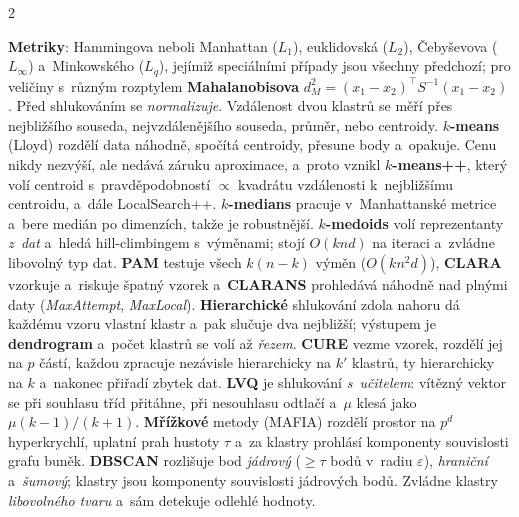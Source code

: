\documentclass[10pt,a4paper]{article}
\newcommand{\hh}[1]{\par\smallskip\noindent{\bfseries\color{headcol}#1}\par\nobreak\vspace{-0.2em}}
\newcommand{\tm}[1]{\textbf{#1}}
\begin{document}
\begin{multicols}{2}
\hh{Klastrová analýza}
\tm{Metriky}: Hammingova neboli Manhattan ($L_1$), euklidovská ($L_2$), Čebyševova
($L_\infty$) a~Minkowského ($L_q$), jejímiž speciálními případy jsou všechny předchozí;
pro veličiny s~různým rozptylem \tm{Mahalanobisova}
$d_M^2=(x_1-x_2)^{\!\top}S^{-1}(x_1-x_2)$. Před shlukováním se \emph{normalizuje}.
Vzdálenost dvou klastrů se měří přes nejbližšího souseda, nejvzdálenějšího souseda, průměr,
nebo centroidy.
\tm{$k$-means} (Lloyd) rozdělí data náhodně, spočítá centroidy, přesune body a~opakuje.
Cenu nikdy nezvýší, ale nedává záruku aproximace, a~proto vznikl \tm{$k$-means++}, který volí
centroid s~pravděpodobností $\propto$ kvadrátu vzdálenosti k~nejbližšímu centroidu, a~dále
LocalSearch++.
\tm{$k$-medians} pracuje v~Manhattanské metrice a~bere medián po dimenzích, takže je
robustnější. \tm{$k$-medoids} volí reprezentanty \emph{z~dat} a~hledá hill-climbingem
s~výměnami; stojí $O(knd)$ na iteraci a~zvládne libovolný typ dat. \tm{PAM} testuje všech
$k(n-k)$ výměn ($O(kn^2d)$), \tm{CLARA} vzorkuje a~riskuje špatný vzorek a~\tm{CLARANS}
prohledává náhodně nad plnými daty (\emph{MaxAttempt}, \emph{MaxLocal}).
\tm{Hierarchické} shlukování zdola nahoru dá každému vzoru vlastní klastr a~pak slučuje dva
nejbližší; výstupem je \tm{dendrogram} a~počet klastrů se volí až \emph{řezem}. \tm{CURE} vezme
vzorek, rozdělí jej na $p$ částí, každou zpracuje nezávisle hierarchicky na $k'$ klastrů, ty
hierarchicky na $k$ a~nakonec přiřadí zbytek dat.
\tm{LVQ} je shlukování \emph{s~učitelem}: vítězný vektor se při souhlasu tříd přitáhne, při
nesouhlasu odtlačí a~$\mu$ klesá jako $\mu(k-1)/(k+1)$.
\tm{Mřížkové} metody (MAFIA) rozdělí prostor na $p^d$ hyperkrychlí, uplatní prah hustoty $\tau$
a~za klastry prohlásí komponenty souvislosti grafu buněk. \tm{DBSCAN} rozlišuje bod
\emph{jádrový} ($\ge\tau$ bodů v~radiu $\varepsilon$), \emph{hraniční} a~\emph{šumový};
klastry jsou komponenty souvislosti jádrových bodů. Zvládne klastry \emph{libovolného tvaru}
a~sám detekuje odlehlé hodnoty.

\end{multicols}
\newpage
\end{document}
